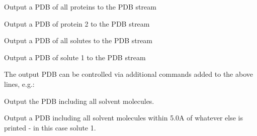 \documentclass[letterpaper,10pt,english]{sphinxmanual}
\begin{document}
Output a PDB of all proteins to the PDB stream

%
\begin{sphinxVerbatim}[commandchars=\\\{\}]
  
\end{sphinxVerbatim}

Output a PDB of protein 2 to the PDB stream

%
\begin{sphinxVerbatim}[commandchars=\\\{\}]
  
\end{sphinxVerbatim}

Output a PDB of all solutes to the PDB stream

%
\begin{sphinxVerbatim}[commandchars=\\\{\}]
  
\end{sphinxVerbatim}

Output a PDB of solute 1 to the PDB stream

The output PDB can be controlled via additional commands added to the above lines, e.g.:

%
\begin{sphinxVerbatim}[commandchars=\\\{\}]
   
\end{sphinxVerbatim}

Output the PDB including all solvent molecules.

%
\begin{sphinxVerbatim}[commandchars=\\\{\}]
   
\end{sphinxVerbatim}

Output a PDB including all solvent molecules within 5.0A of whatever else is printed - in this case solute 1.

%
\begin{sphinxVerbatim}[commandchars=\\\{\}]
   
\end{sphinxVerbatim}
\end{document}
